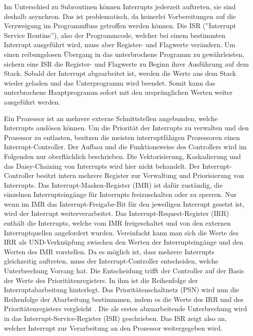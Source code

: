 \documentclass[a4paper,12pt]{article}
\begin{document}
\par\bigskip
\noindent Im Unterschied zu Subroutinen können Interrupts jederzeit auftreten, sie sind deshalb asynchron. Das ist problematisch, da keinerlei Vorbereitungen auf die Verzweigung im Programmfluss getroffen werden können. Die ISR (''Interrupt Service Routine''), also der Programmcode, welcher bei einem bestimmten Interrupt ausgeführt wird, muss aber Register- und Flagwerte verändern. Um einen reibungslosen Übergang in das unterbrochene Programm zu gewährleisten, sichern eine ISR die Register- und Flagwerte zu Beginn ihrer Ausführung auf dem Stack. Sobald der Interrupt abgearbeitet ist, werden die Werte aus dem Stack wieder geladen und das Unterprogramm wird beendet. Somit kann das unterbrochene Hauptprogramm sofort mit den ursprünglichen Werten weiter ausgeführt werden.
 
\par\bigskip\noindent Ein Prozessor ist an mehrere externe Schnittstellen angebunden, welche Interrupts auslösen können. Um die Priorität der Interrupts zu verwalten und den Prozessor zu entlasten, besitzen die meisten interruptfähigen Prozessoren einen Interrupt-Controller. Der Aufbau und die Funktionsweise des Controllers wird im Folgenden nur oberflächlich beschrieben. Die Vektorisierung, Kaskadierung und das Daisy-Chaining von Interrupts wird hier nicht behandelt.
Der Interrupt-Controller besitzt intern mehrere Register zur Verwaltung und Priorisierung von Interrupts. Das Interrupt-Masken-Register (IMR) ist dafür zuständig, die einzelnen Interrupteingänge für Interrupts freizuschalten oder zu sperren. Nur wenn im IMR das Interrupt-Freigabe-Bit für den jeweiligen Interrupt gesetzt ist, wird der Interrupt weiterverarbeitet. Das Interrupt-Request-Register (IRR) enthält die Interrupts, welche vom IMR freigeschaltet  und von den externen Interruptquellen angefordert wurden. Vereinfacht kann man sich die Werte des IRR als UND-Verknüpfung zwischen den Werten der Interrupteingänge und den Werten des IMR vorstellen. Da es möglich ist, dass mehrere Interrupts gleichzeitig auftreten, muss der Interrupt-Controller entscheiden, welche Unterbrechung Vorrang hat. Die Entscheidung trifft der Controller auf der Basis der Werte des Prioritätenregisters. In ihm ist die Reihenfolge der Interruptabarbeitung hinterlegt. Das Prioritätenschaltnetz (PSN) wird nun die Reihenfolge der Abarbeitung bestimmmen, indem es die Werte des IRR und des Prioritätenregisters vergleicht . Die als erstes abzuarbeitende Unterbrechung wird in das Interrupt-Service-Register (ISR) geschrieben. Das ISR zeigt also an, welcher Interrupt zur Verarbeitung an den Prozessor weitergegeben wird. \cite[S.114ff]{mikroprozessortechnik2011}
\end{document}
